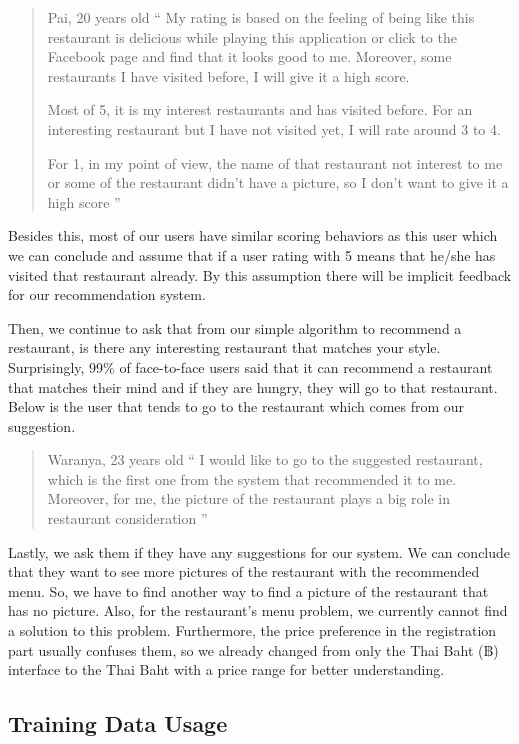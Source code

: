 \documentclass[12pt,oneside,openright,a4paper]{cpe-english-project}
\begin{document}
\begin{quote}{Pai, 20 years old}
“ My rating is based on the feeling of being like this restaurant is delicious while playing this application or click to the Facebook page and find that it looks good to me. Moreover, some restaurants I have visited before, I will give it a high score.

Most of 5, it is my interest restaurants and has visited before. For an interesting restaurant but I have not visited yet, I will rate around 3 to 4.

For 1, in my point of view, the name of that restaurant not interest to me or some of the restaurant didn’t have a picture, so I don’t want to give it a high score ”
\end{quote}

Besides this, most of our users have similar scoring behaviors as this user which we can conclude and assume that if a user rating with 5 means that he/she has visited that restaurant already. By this assumption there will be implicit feedback for our recommendation system.

Then, we continue to ask that from our simple algorithm to recommend a restaurant, is there any interesting restaurant that matches your style. Surprisingly, 99\% of face-to-face users said that it can recommend a restaurant that matches their mind and if they are hungry, they will go to that restaurant. Below is the user that tends to go to the restaurant which comes from our suggestion.

\begin{quote}{Waranya, 23 years old}
“ I would like to go to the suggested restaurant, which is the first one from the system that recommended it to me. Moreover, for me, the picture of the restaurant plays a big role in restaurant consideration ”
\end{quote}

Lastly, we ask them if they have any suggestions for our system. We can conclude that they want to see more pictures of the restaurant with the recommended menu. So, we have to find another way to find a picture of the restaurant that has no picture. Also, for the restaurant’s menu problem, we currently cannot find a solution to this problem. Furthermore, the price preference in the registration part usually confuses them, so we already changed from only the Thai Baht (฿) interface to the Thai Baht with a price range for better understanding.

\subsection{Training Data Usage}
\end{document}
